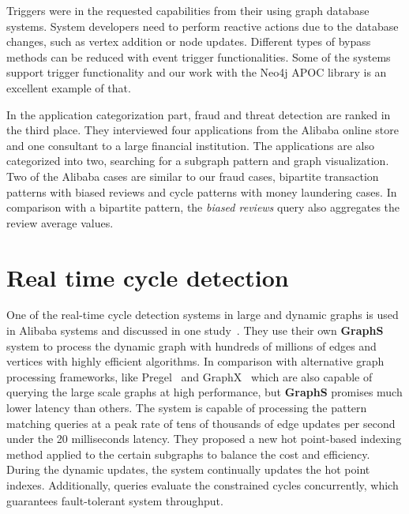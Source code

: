 Triggers were in the requested capabilities from their using graph database systems.
System developers need to perform reactive actions due to the database changes, such as vertex addition or node updates.
Different types of bypass methods can be reduced with event trigger functionalities.
Some of the systems support trigger functionality and our work with the Neo4j APOC library is an excellent example of that.

In the application categorization part, fraud and threat detection are ranked in the third place.
They interviewed four applications from the Alibaba online store and one consultant to a large financial institution.
The applications are also categorized into two, searching for a subgraph pattern and graph visualization.
Two of the Alibaba cases are similar to our fraud cases, bipartite transaction patterns with biased reviews and cycle patterns with money laundering cases.
In comparison with a bipartite pattern, the \emph{biased reviews} query also aggregates the review average values.

\section{Real time cycle detection}

One of the real-time cycle detection systems in large and dynamic graphs is used in Alibaba systems and discussed in one study~\cite{DBLP:journals/pvldb/QiuCQPZLZ18}.
They use their own \textbf{GraphS} system to process the dynamic graph with hundreds of millions of edges and vertices with highly efficient algorithms.
In comparison with alternative graph processing frameworks, like Pregel~\cite{10.1145/1807167.1807184} and GraphX~\cite{DBLP:conf/osdi/GonzalezXDCFS14} which are also capable of querying the large scale graphs at high performance, but \textbf{GraphS} promises much lower latency than others.
The system is capable of processing the pattern matching queries at a peak rate of tens of thousands of edge updates per second under the 20 milliseconds latency.
They proposed a new hot point-based indexing method applied to the certain subgraphs to balance the cost and efficiency.
During the dynamic updates, the system continually updates the hot point indexes.
Additionally, queries evaluate the constrained cycles concurrently, which guarantees fault-tolerant system throughput.


